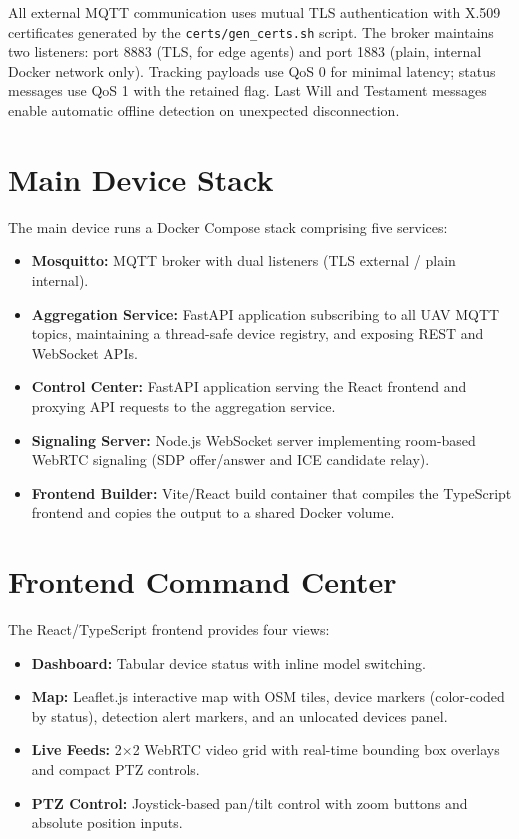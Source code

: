 \documentclass[12pt,a4paper]{report}
\begin{document}
All external MQTT communication uses mutual TLS authentication with X.509
certificates generated by the \texttt{certs/gen\_certs.sh} script. The broker
maintains two listeners: port 8883 (TLS, for edge agents) and port 1883 (plain,
internal Docker network only). Tracking payloads use QoS 0 for minimal latency;
status messages use QoS 1 with the retained flag. Last Will and Testament messages
enable automatic offline detection on unexpected disconnection.

\section{Main Device Stack}

The main device runs a Docker Compose stack comprising five services:

\begin{itemize}
  \item \textbf{Mosquitto:} MQTT broker with dual listeners (TLS external / plain internal).
  \item \textbf{Aggregation Service:} FastAPI application subscribing to all UAV
  MQTT topics, maintaining a thread-safe device registry, and exposing REST and
  WebSocket APIs.
  \item \textbf{Control Center:} FastAPI application serving the React frontend
  and proxying API requests to the aggregation service.
  \item \textbf{Signaling Server:} Node.js WebSocket server implementing room-based
  WebRTC signaling (SDP offer/answer and ICE candidate relay).
  \item \textbf{Frontend Builder:} Vite/React build container that compiles the
  TypeScript frontend and copies the output to a shared Docker volume.
\end{itemize}

\section{Frontend Command Center}

The React/TypeScript frontend provides four views:

\begin{itemize}
  \item \textbf{Dashboard:} Tabular device status with inline model switching.
  \item \textbf{Map:} Leaflet.js interactive map with OSM tiles, device markers
  (color-coded by status), detection alert markers, and an unlocated devices panel.
  \item \textbf{Live Feeds:} 2$\times$2 WebRTC video grid with real-time bounding
  box overlays and compact PTZ controls.
  \item \textbf{PTZ Control:} Joystick-based pan/tilt control with zoom buttons
  and absolute position inputs.
\end{itemize}
\end{document}
